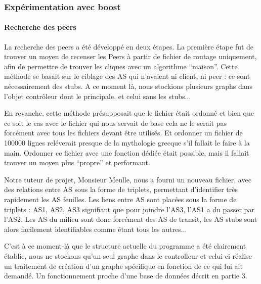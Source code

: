 \subsubsection{Expérimentation avec boost}
\paragraph{Recherche des peers\\}
\par La recherche des peers a été développé en deux étapes. La première étape fut de trouver un moyen de recenser les Peers à partir de fichier de routage uniquement, afin de permettre de trouver les cliques avec un algorithme ``maison''. Cette méthode se basait sur le ciblage des AS qui n'avaient ni client, ni peer : ce sont n\'ecessairement des stubs. A ce moment là, nous stockions plusieurs graphs dans l'objet contrôleur dont le principale, et celui sans les stubs... 

En revanche, cette méthode présupposait que le fichier était ordonné et bien que ce soit le cas avec le fichier qui nous servait de base cela ne le serait pas forcément avec tous les fichiers devant être utilisés. Et ordonner un fichier de 100000 lignes reléverait presque de la mythologie grecque s'il fallait le faire à la main. Ordonner ce fichier avec une fonction dédiée était possible, mais il fallait trouver un moyen plus ``propre'' et performant.

\par Notre tuteur de projet, Monsieur Meulle, nous a fourni un nouveau fichier, avec des relations entre AS sous la forme de triplets, permettant d'identifier tr\`es rapidement les AS feuilles.
Les liens entre AS sont plac\'ees sous la forme de triplets : {AS1, AS2, AS3} signifiant que pour joindre l'AS3, l'AS1 a du passer par l'AS2. Les AS du milieu sont donc forcément des AS de transit, les AS stubs sont alors facilement identifiables comme \'etant tous les autres... 

C'est à ce moment-là que le structure actuelle du programme a été clairement établie, nous ne stockons qu'un seul graphe dans le controlleur et celui-ci réalise un traitement de création d'un graphe spécifique en fonction de ce qui lui ait demandé. Un fonctionnement proche d'une base de données décrit en partie 3.


